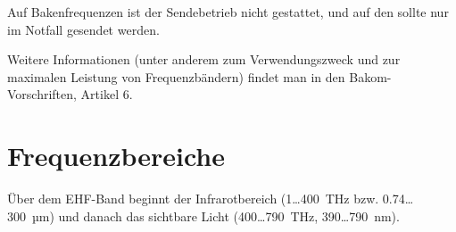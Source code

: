 \vspace{1em}
Auf Bakenfrequenzen ist der Sendebetrieb nicht gestattet, und auf den  sollte nur im Notfall gesendet werden. 

Weitere Informationen (unter anderem zum Verwendungszweck und zur maximalen Leistung von Frequenzbändern) findet man in den Bakom-Vorschriften, Artikel 6. 
\vfill

\newpage
\section{Frequenzbereiche}

Über dem EHF-Band beginnt der Infrarotbereich (1…400 THz bzw. 0.74…300 µm) und danach das sichtbare Licht (400…790 THz, 390…790 nm).

